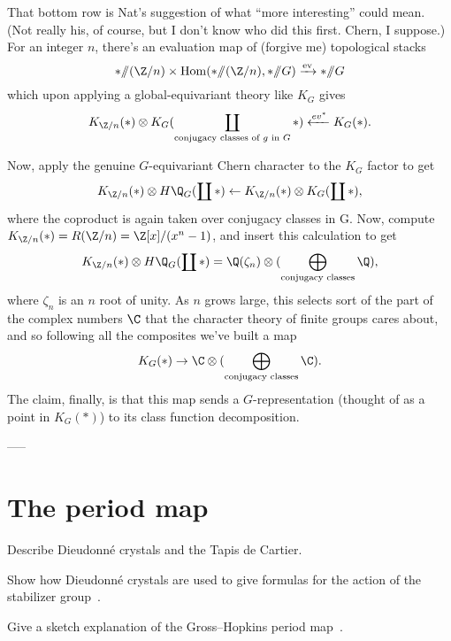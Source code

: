 That bottom row is Nat's suggestion of what ``more interesting'' could mean. (Not really his, of course, but I don't know who did this first. Chern, I suppose.) For an integer $n$, there's an evaluation map of (forgive me) topological stacks \[* \mmod (\Z/n) \times \operatorname{Hom}(* \mmod (\Z/n), * \mmod G) \xrightarrow{\mathrm{ev}} * \mmod G\] which upon applying a global-equivariant theory like $K_G$ gives \[K_{\Z/n}(*) \otimes K_G(\coprod_{\text{conjugacy classes of $g$ in $G$}} *) \xleftarrow{ev^*} K_G(*).\]

Now, apply the genuine $G$-equivariant Chern character to the $K_G$ factor to get \[K_{\Z/n}(*) \otimes H\Q_G(\coprod *) \from K_{\Z/n}(*) \otimes K_G(\coprod *),\] where the coproduct is again taken over conjugacy classes in G. Now, compute $K_{\Z/n}(*) = R(\Z/n) = \Z[x] / (x^n - 1)$, and insert this calculation to get \[K_{\Z/n}(*) \otimes H\Q_G(\coprod *) = \Q(\zeta_n) \otimes (\bigoplus_{\text{conjugacy classes}} \Q),\] where $\zeta_n$ is an $n${\th} root of unity.  As $n$ grows large, this selects sort of the part of the complex numbers $\C$ that the character theory of finite groups cares about, and so following all the composites we've built a map \[K_G(*) \to \C \otimes (\bigoplus_{\text{conjugacy classes}} \C).\]  The claim, finally, is that this map sends a $G$-representation (thought of as a point in $K_G(*)$) to its class function decomposition.


-----




\section{The period map}\label{ThePeriodMapSection}


Describe Dieudonn\'e crystals and the Tapis de Cartier.

Show how Dieudonn\'e crystals are used to give formulas for the action of the stabilizer group~\cite{DevinatzHopkins}.

Give a sketch explanation of the Gross--Hopkins period map~\cite{Weinstein}.

